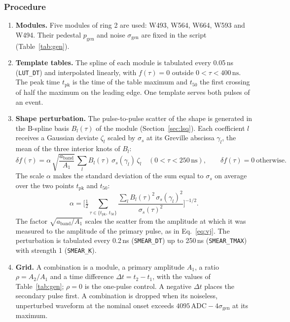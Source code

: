 \documentclass[11pt]{article}
\newcommand{\ns}{\,\mathrm{ns}}
\newcommand{\adc}{\,\mathrm{ADC}}
\newcommand{\code}[1]{\texttt{#1}}
\begin{document}
\subsubsection{Procedure}

\begin{enumerate}
\item \textbf{Modules.} Five modules of ring 2 are used: W493, W564, W664, W593 and W494. Their pedestal $p_{\mathrm{gen}}$ and noise $\sigma_{\mathrm{gen}}$ are fixed in the script (Table~\ref{tab:gen}).
\item \textbf{Template tables.} The spline of each module is tabulated every 0.05\,ns (\code{LUT\_DT}) and interpolated linearly, with $f(\tau) = 0$ outside $0 < \tau < 400\ns$. The peak time $t_{\mathrm{pk}}$ is the time of the table maximum and $t_{50}$ the first crossing of half the maximum on the leading edge. One template serves both pulses of an event.
\item \textbf{Shape perturbation.} The pulse-to-pulse scatter of the shape is generated in the B-spline basis $B_l(\tau)$ of the module (Section~\ref{sec:lsq}). Each coefficient $l$ receives a Gaussian deviate $\zeta_l$ scaled by $\sigma_s$ at its Greville abscissa $\gamma_l$, the mean of the three interior knots of $B_l$:
\begin{equation}
\delta f(\tau) = \alpha\, \sqrt{\frac{a_{\mathrm{band}}}{A_1}}\, \sum_l B_l(\tau)\, \sigma_s(\gamma_l)\, \zeta_l
\quad (0 < \tau < 250\ns),
\qquad
\delta f(\tau) = 0 \ \text{otherwise}.
\label{eq:deltaf}
\end{equation}
The scale $\alpha$ makes the standard deviation of the sum equal to $\sigma_s$ on average over the two points $t_{\mathrm{pk}}$ and $t_{50}$:
\begin{equation}
\alpha = \Big[ \tfrac{1}{2} \sum_{\tau \in \{t_{\mathrm{pk}},\, t_{50}\}} \frac{\sum_l B_l(\tau)^2\, \sigma_s(\gamma_l)^2}{\sigma_s(\tau)^2} \Big]^{-1/2} .
\label{eq:alpha}
\end{equation}
The factor $\sqrt{a_{\mathrm{band}}/A_1}$ scales the scatter from the amplitude at which it was measured to the amplitude of the primary pulse, as in Eq.~\eqref{eq:vj}. The perturbation is tabulated every 0.2\,ns (\code{SMEAR\_DT}) up to 250\,ns (\code{SMEAR\_TMAX}) with strength 1 (\code{SMEAR\_K}).
\item \textbf{Grid.} A combination is a module, a primary amplitude $A_1$, a ratio $\rho = A_2/A_1$ and a time difference $\Delta t = t_2 - t_1$, with the values of Table~\ref{tab:gen}; $\rho = 0$ is the one-pulse control. A negative $\Delta t$ places the secondary pulse first. A combination is dropped when its noiseless, unperturbed waveform at the nominal onset exceeds $4095\adc - 4\sigma_{\mathrm{gen}}$ at its maximum.

\end{enumerate}
\end{document}
